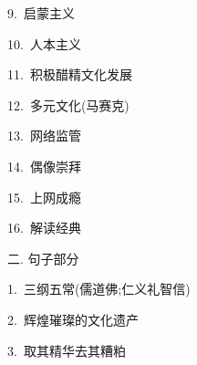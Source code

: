 \documentclass[a4paper, 12pt]{article}
\begin{document}
\begin{multicols}{2}
\begin{flushleft}
9.\ 启蒙主义 \ \ \ \ \underline{\hspace{3cm}}
\end{flushleft}

\begin{flushleft}
10.\ 人本主义 \ \ \ \ \underline{\hspace{3cm}}
\end{flushleft}
\end{multicols}

\begin{multicols}{2}
\begin{flushleft}
11.\ 积极醋精文化发展 \ \ \ \ \underline{\hspace{3cm}}
\end{flushleft}

\begin{flushleft}
12.\ 多元文化(马赛克) \ \ \ \ \underline{\hspace{3cm}}
\end{flushleft}
\end{multicols}

\begin{multicols}{2}
\begin{flushleft}
13.\ 网络监管 \ \ \ \ \underline{\hspace{3cm}}
\end{flushleft}

\begin{flushleft}
14.\ 偶像崇拜 \ \ \ \ \underline{\hspace{3cm}}
\end{flushleft}
\end{multicols}

\begin{multicols}{2}
\begin{flushleft}
15.\ 上网成瘾 \ \ \ \ \underline{\hspace{3cm}}
\end{flushleft}

\begin{flushleft}
16.\ 解读经典 \ \ \ \ \underline{\hspace{3cm}}
\end{flushleft}
\end{multicols}

\begin{flushleft}
二. 句子部分
\end{flushleft}

\begin{flushleft}
1.\ 三纲五常(儒道佛;仁义礼智信)

\underline{\hspace{16cm}}
\end{flushleft}

\begin{flushleft}
2.\ 辉煌璀璨的文化遗产

\underline{\hspace{16cm}}
\end{flushleft}

\begin{flushleft}
3.\ 取其精华去其糟粕

\underline{\hspace{16cm}}
\end{flushleft}
\end{document}
